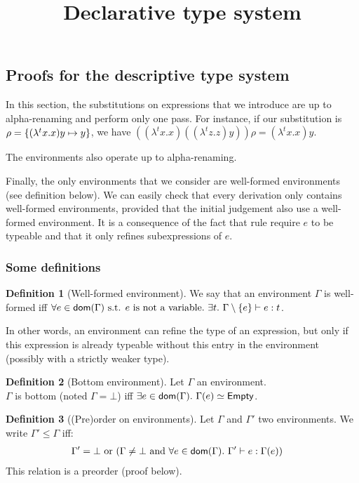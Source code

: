 \documentclass[a4paper]{article}
\title{\vspace{1.5cm}Declarative type system}
\author{}
\date{\vspace{-5ex}}
\theoremstyle{definition}
\newtheorem{definition}{Definition}
\begin{document}
  \maketitle

  \subsection{Proofs for the descriptive type system}

  In this section, the substitutions on expressions that we introduce are up to alpha-renaming and perform only one pass.
  For instance, if our substitution is $\rho=\{(\lambda^t x. x) y \mapsto y\}$, we have $((\lambda^t x. x)((\lambda^t z. z) y))\rho = (\lambda^t x. x) y$.
  
  The environments also operate up to alpha-renaming.

  Finally, the only environments that we consider are well-formed environments (see definition below). We can easily
  check that every derivation only contains well-formed environments, provided that the initial judgement also use a well-formed environment.
  It is a consequence of the fact that rule  require $e$ to be typeable and that it only refines subexpressions of $e$.

    \subsubsection{Some definitions}

    \begin{definition}[Well-formed environment]
      We say that an environment $\Gamma$ is well-formed iff
      $\forall e\in\textsf{dom}(\Gamma) \text{ s.t. $e$ is not a variable}.\ \exists t.\ \Gamma\setminus\{e\} \vdash e:t$.

      In other words, an environment can refine the type of an expression, but only if this expression is already typeable
      without this entry in the environment (possibly with a strictly weaker type).
    \end{definition}

    \begin{definition}[Bottom environment]
      Let $\Gamma$ an environment.\\
      $\Gamma$ is bottom (noted $\Gamma = \bot$) iff $\exists e\in\dom\Gamma.\ \Gamma(e)\simeq\Empty$.
    \end{definition}

      \begin{definition}[(Pre)order on environments]
        Let $\Gamma$ and $\Gamma'$ two environments. We write $\Gamma' \leq \Gamma$ iff:
        \begin{align*}
          &\Gamma'=\bot \text{ or } (\Gamma\neq\bot \text{ and } \forall e \in \textsf{dom}(\Gamma).\ \Gamma' \vdash e : \Gamma(e))
        \end{align*}
        This relation is a preorder (proof below).
      \end{definition}
    
\end{document}
